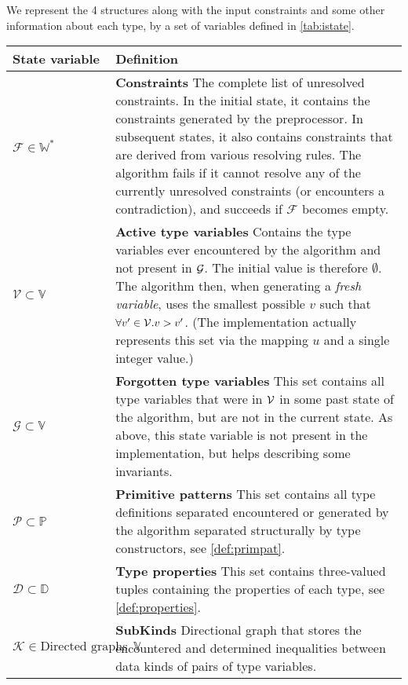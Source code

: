 We represent the 4 structures along with the input constraints and some other information about each type, by a set of variables defined in \cref{tab:istate}.

\begin{table}
\scriptsize
\def\arraystretch{1.3}
\begin{tabular}{p{.23\linewidth}p{.7\linewidth}}
\toprule
State variable & Definition \\
\midrule
  $\mathcal{F} \in \mathbb{W}^\ast$ & \textbf{Constraints}\quad
  The complete list of unresolved constraints. In the initial state, it contains the constraints generated by the preprocessor. In subsequent states, it also contains constraints that are derived from various resolving rules. The algorithm fails if it cannot resolve any of the currently unresolved constraints (or encounters a contradiction), and succeeds if $\mathcal{F}$ becomes empty. \\

  $\mathcal{V} \subset \mathbb{V}$ & \textbf{Active type variables}\quad
  Contains the type variables ever encountered by the algorithm and not present in $\mathcal G$. The initial value is therefore $\emptyset$. The algorithm then, when generating a \emph{fresh variable}, uses the smallest possible $v$ such that $\forall v' \in \mathcal V. v > v'$. (The implementation actually represents this set via the mapping $u$ and a single integer value.) \\

  $\mathcal{G} \subset \mathbb{V}$ & \textbf{Forgotten type variables}\quad
  This set contains all type variables that were in $\mathcal V$ in some past state of the algorithm, but are not in the current state. As above, this state variable is not present in the implementation, but helps describing some invariants. \\

  $\mathcal{P} \subset \mathbb{P}$ & \textbf{Primitive patterns}\quad
  This set contains all type definitions separated encountered or generated by the algorithm separated structurally by type constructors, see \cref{def:primpat}. \\

  $\mathcal{D} \subset \mathbb{D}$ & \textbf{Type properties}\quad
  This set contains three-valued tuples containing the properties of each type, see \cref{def:properties}. \\

  $\mathcal{K} \in \text{Directed graphs on}\ \mathbb{V}$ & \textbf{SubKinds}\quad
  Directional graph that stores the encountered and determined inequalities between data kinds of pairs of type variables. \\


\end{tabular}
\end{table}
